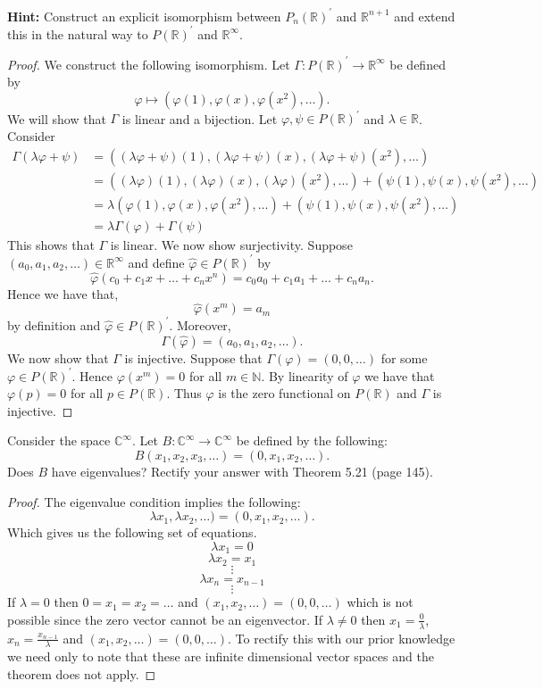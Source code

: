 \documentclass[11pt]{exam}
\theoremstyle{definition}
\begin{document}
\begin{questions}
{\bf Hint: }Construct an explicit isomorphism between $P_n(\mathbb{R})^\prime$ and $\mathbb{R}^{n+1}$ and extend this in the natural way to $P(\mathbb{R})^\prime$ and $\mathbb{R}^\infty$. 
\begin{proof} We construct the following isomorphism. Let $\Gamma: P(\mathbb{R})^\prime\rightarrow \mathbb{R}^\infty$ be defined by 
\[\varphi\mapsto (\varphi(1), \varphi(x), \varphi(x^2), \ldots).\]
We will show that $\Gamma$ is linear and a bijection. Let $\varphi, \psi\in P(\mathbb{R})^\prime$ and $\lambda \in \mathbb{R}$. Consider 
\begin{align*}
\Gamma(\lambda \varphi+\psi)&=((\lambda \varphi+\psi)(1),(\lambda \varphi+\psi)(x),(\lambda \varphi+\psi)(x^2),\ldots)\\
&= ((\lambda \varphi)(1),(\lambda \varphi)(x),(\lambda \varphi)(x^2),\ldots)+(\psi(1),\psi(x),\psi(x^2),\ldots)\\
&= \lambda(\varphi(1),\varphi(x),\varphi(x^2),\ldots)+(\psi(1),\psi(x),\psi(x^2),\ldots)\\
&=\lambda \Gamma(\varphi)+\Gamma(\psi)
\end{align*}
This shows that $\Gamma$ is linear. We now show surjectivity. Suppose $(a_0, a_1,a_2,\ldots)\in \mathbb{R}^\infty$ and define $\hat{\varphi}\in P(\mathbb{R})^\prime$ by 
\[\hat{\varphi}(c_0+c_1x+\ldots+c_nx^n)=c_0a_0+c_1a_1+\ldots +c_na_n.\]
Hence we have that, 
\[\hat{\varphi}(x^m)=a_m\]
by definition and $\hat{\varphi}\in P(\mathbb{R})^\prime$. Moreover, 
\[\Gamma(\hat{\varphi})=(a_0,a_1,a_2,\ldots).\] We now show that $\Gamma$ is injective. Suppose that $\Gamma(\varphi)=(0,0,\ldots)$ for some $\varphi\in P(\mathbb{R})^\prime$. Hence $\varphi(x^m)=0$ for all $m\in \mathbb{N}$. By linearity of $\varphi$ we have that $\varphi(p)=0$ for all $p\in P(\mathbb{R})$. Thus $\varphi$ is the zero functional on $P(\mathbb{R})$ and $\Gamma$ is injective.
\end{proof}
\question Consider the space $\mathbb{C}^\infty$. Let $B:\mathbb{C}^\infty\rightarrow \mathbb{C}^\infty$ be defined by the following:
\[B(x_1, x_2, x_3,\ldots) =(0, x_1, x_2, \ldots).\]
Does $B$ have eigenvalues? Rectify your answer with Theorem 5.21 (page 145).
\begin{proof} The eigenvalue condition implies the following: 
\[\lambda x_1, \lambda x_2, \ldots)=(0, x_1, x_2,\ldots).\]
Which gives us the following set of equations. 
\[\lambda x_1=0\]
\[\lambda x_2=x_1\]
\[\vdots\]
\[\lambda x_n=x_{n-1}\]
\[\vdots\]
If $\lambda =0$ then $0=x_1=x_2=\ldots$ and $(x_1,x_2,\ldots)=(0,0,\ldots)$ which is not possible since the zero vector cannot be an eigenvector. If $\lambda\neq 0$ then $x_1=\frac{0}{\lambda}$, $x_n=\frac{x_{n-1}}{\lambda}$ and $(x_1,x_2,\ldots)=(0,0,\ldots)$. To rectify this with our prior knowledge we need only to note that these are infinite dimensional vector spaces and the theorem does not apply. 

\end{proof}
\end{questions}
\end{document}
